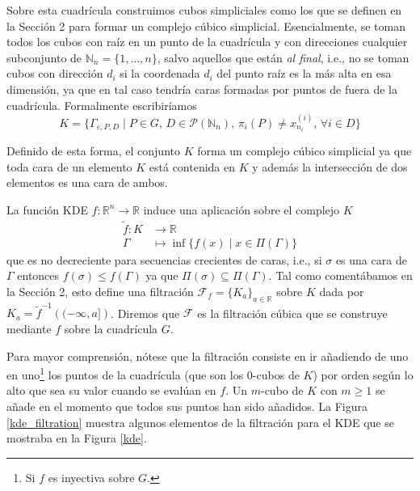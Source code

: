 \documentclass[12pt,a4paper,twoside]{article} %
\theoremstyle{plain}
\theoremstyle{definition}
\newcommand{\N}{\mathbb{N}}
\newcommand{\R}{\mathbb{R}}
\newcommand{\tq}{\; | \;}
\newcommand{\map}[3]{#1 \colon #2 \to #3}
\newcommand{\Map}[5]{\begin{align*}
					#1\colon   #2 &\to     #3 \\
							   #4 &\mapsto #5
					\end{align*}}
\begin{document}
Sobre esta cuadrícula construimos cubos simpliciales como los que se definen en la Sección 2 para formar un complejo cúbico simplicial. Esencialmente, se toman todos los cubos con raíz en un punto de la cuadrícula y con direcciones cualquier subconjunto de $\N_n = \{1,\dots,n\}$, salvo aquellos que están \emph{al final}, i.e., no se toman cubos con dirección $d_i$ si la coordenada $d_i$ del punto raíz es la más alta en esa dimensión, ya que en tal caso tendría caras formadas por puntos de fuera de la cuadrícula. Formalmente escribiríamos 
$$ K = \lbrace \Gamma_{\varepsilon,P,D} \tq P\in G, \, D \in \mathcal{P}(\N_n), \, \pi_i(P) \neq x_{n_i}^{(i)}, \, \forall i \in D \rbrace $$

Definido de esta forma, el conjunto $K$ forma un complejo cúbico simplicial ya que toda cara de un elemento $K$ está contenida en $K$ y además la intersección de dos elementos es una cara de ambos.

La función KDE $\map{f}{\R^n}{\R}$ induce una aplicación sobre el complejo $K$
\Map{\tilde{f}}{K}{\R}{\Gamma}{\inf \lbrace f(x) \tq x \in \Pi(\Gamma) \rbrace}
que es no decreciente para secuencias crecientes de caras, i.e., si $\sigma$ es una cara de $\Gamma$ entonces $f(\sigma) \leq f(\Gamma)$ ya que $\Pi(\sigma) \subseteq \Pi(\Gamma)$. Tal como comentábamos en la Sección 2, esto define una filtración $\mathcal{F}_f = \{K_a\}_{a\in\R}$ sobre $K$ dada por $K_a = \tilde{f}^{-1}\left((-\infty,a]\right)$. Diremos que $\mathcal{F}$ es la filtración cúbica que se construye mediante $f$ sobre la cuadrícula $G$.

Para mayor comprensión, nótese que la filtración consiste en ir añadiendo de uno en uno\footnote{Si $f$ es inyectiva sobre $G$.} los puntos de la cuadrícula (que son los $0$-cubos de $K$) por orden según lo alto que sea su valor cuando se evalúan en $f$. Un $m$-cubo de $K$ con $m \geq 1$ se añade en el momento que todos sus puntos han sido añadidos. La Figura \ref{kde_filtration} muestra algunos elementos de la filtración para el KDE que se mostraba en la Figura \ref{kde}.
\end{document}
